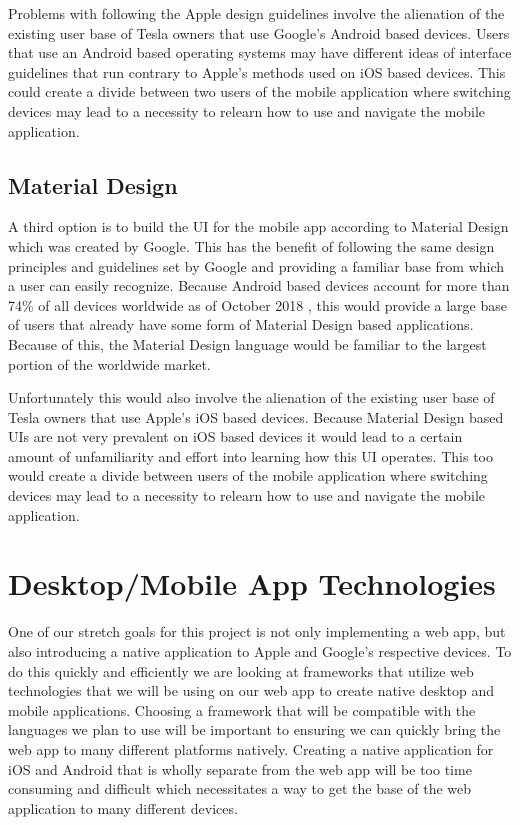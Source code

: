 \documentclass[10pt,draftclsnofoot,onecolumn,journal,compsoc]{IEEEtran}
\begin{document}
Problems with following the Apple design guidelines involve the alienation of the existing user base of Tesla owners that use Google's Android based devices. Users that use an Android based operating systems may have different ideas of interface guidelines that run contrary to Apple's methods used on iOS based devices. This could create a divide between two users of the mobile application where switching devices may lead to a necessity to relearn how to use and navigate the mobile application. 

\subsection{Material Design}
A third option is to build the UI for the mobile app according to Material Design \cite{androidInterface} which was created by Google. This has the benefit of following the same design principles and guidelines set by Google and providing a familiar base from which a user can easily recognize. Because Android based devices account for more than 74\% of all devices worldwide as of October 2018 \cite{globalStats}, this would provide a large base of users that already have some form of Material Design based applications. Because of this, the Material Design language would be familiar to the largest portion of the worldwide market. 

Unfortunately this would also involve the alienation of the existing user base of Tesla owners that use Apple's iOS based devices. Because Material Design based UIs are not very prevalent on iOS based devices it would lead to a certain amount of unfamiliarity and effort into learning how this UI operates. This too would create a divide between users of the mobile application where switching devices may lead to a necessity to relearn how to use and navigate the mobile application. 

\section{Desktop/Mobile App Technologies}
One of our stretch goals for this project is not only implementing a web app, but also introducing a native application to Apple and Google's respective devices. To do this quickly and efficiently we are looking at frameworks that utilize web technologies that we will be using on our web app to create native desktop and mobile applications. Choosing a framework that will be compatible with the languages we plan to use will be important to ensuring we can quickly bring the web app to many different platforms natively. Creating a native application for iOS and Android that is wholly separate from the web app will be too time consuming and difficult which necessitates a way to get the base of the web application to many different devices. 
\end{document}
